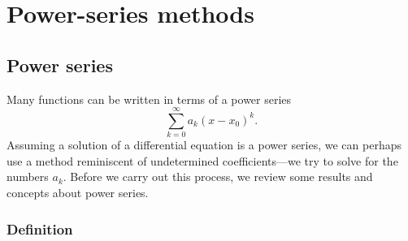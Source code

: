 \chapter{Power-series methods} \label{ps:chapter}


\section{Power series}
\label{powerseries:section}



Many functions can be written in terms of a power series
\begin{equation*}
\sum_{k=0}^\infty a_k {(x-x_0)}^k .
\end{equation*}
Assuming a solution of a differential equation is a
power series, we can perhaps use a method reminiscent of undetermined
coefficients---we try to solve for the numbers $a_k$.
Before we carry out this process, we review some results
and concepts about power series.

\subsection{Definition}

